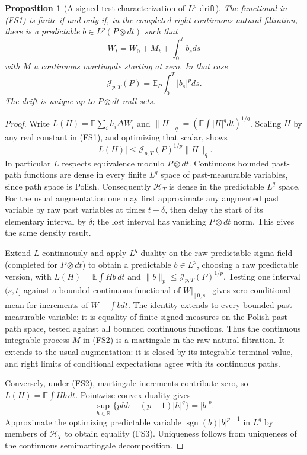 \documentclass[11pt]{article}
\newtheorem{proposition}[theorem]{Proposition}
\theoremstyle{definition}\newtheorem{definition}[theorem]{Definition}
\theoremstyle{remark}\newtheorem{remark}[theorem]{Remark}
\begin{document}
\begin{proposition}[A signed-test characterization of $L^p$ drift]
\label{prop:signed-test-lp-drift}
The functional in (FS1) is finite if and only if, in the completed
right-continuous natural filtration, there is a predictable
$b\in L^p(P\otimes dt)$ such that
\[
 W_t=W_0+M_t+\int_0^t b_sds
 \tag{FS2}
\]
with $M$ a continuous martingale starting at zero. In that case
\[
 \mathcal J_{p,T}(P)=\mathbb E_P\int_0^T|b_s|^pds.
 \tag{FS3}
\]
The drift is unique up to $P\otimes dt$-null sets.
\end{proposition}
\begin{proof}
Write $L(H)=\mathbb E\sum_i h_i\Delta W_i$ and
$\|H\|_q=(\mathbb E\int|H|^qdt)^{1/q}$. Scaling $H$ by any real
constant in (FS1), and optimizing that scalar, shows
\[
 |L(H)|\le\mathcal J_{p,T}(P)^{1/p}\|H\|_q.
 \tag{FS4}
\]
In particular $L$ respects equivalence modulo $P\otimes dt$.
Continuous bounded past-path functions are dense in every finite
$L^q$ space of past-measurable variables, since path space is Polish.
Consequently $\mathcal H_T$ is dense in the predictable $L^q$ space.
For the usual augmentation one may first approximate any augmented
past variable by raw past variables at times $t+\delta$, then delay
the start of its elementary interval by $\delta$; the lost interval
has vanishing $P\otimes dt$ norm. This gives the same density result.

Extend $L$ continuously and apply $L^q$ duality on the raw predictable
sigma-field (completed for $P\otimes dt$) to obtain a predictable
$b\in L^p$, choosing a raw predictable version, with
$L(H)=\mathbb E\int Hb\,dt$ and
$\|b\|_p\le\mathcal J_{p,T}(P)^{1/p}$.
Testing one interval $(s,t]$ against a bounded continuous functional of
$W|_{[0,s]}$ gives zero conditional mean for increments of
$W-\int bdt$. The identity extends to every bounded past-measurable
variable: it is equality of finite signed measures on the Polish
past-path space, tested against all bounded continuous functions.
Thus the continuous integrable process $M$ in (FS2) is a martingale
in the raw natural filtration. It extends to the usual augmentation:
it is closed by its integrable terminal value, and right limits of
conditional expectations agree with its continuous paths.

Conversely, under (FS2), martingale increments contribute zero, so
$L(H)=\mathbb E\int Hb\,dt$. Pointwise convex duality gives
\[
 \sup_{h\in\mathbb R}\{phb-(p-1)|h|^q\}=|b|^p.
\]
Approximate the optimizing predictable variable
$\operatorname{sgn}(b)|b|^{p-1}$ in $L^q$ by members of
$\mathcal H_T$ to obtain equality (FS3). Uniqueness follows from
uniqueness of the continuous semimartingale decomposition.
\end{proof}
\end{document}
